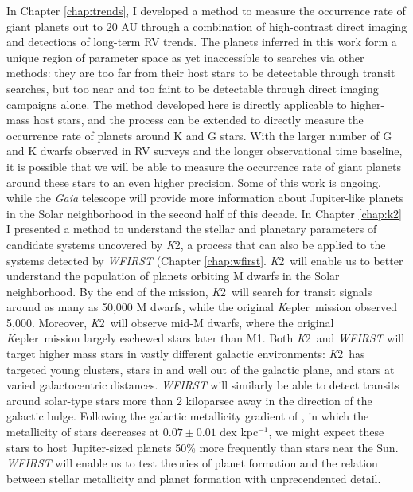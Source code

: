 \documentclass[12pt]{caltech_thesis}
\newcommand{\kep}{{\textit Kepler}}
\newcommand{\KT}{{\textit K2}}
\begin{document}
In Chapter \ref{chap:trends}, I developed a method to measure the occurrence rate of giant
planets out to 20 AU through a combination of high-contrast direct imaging and 
detections of long-term RV trends.
The planets inferred in this work form a unique region of parameter space as yet 
inaccessible to searches via other methods:
they are too far from their host stars to be detectable through transit searches,
but too near and too faint to be detectable through direct imaging campaigns alone.
The method developed here is directly applicable to higher-mass host stars, and the
process can be extended to directly measure the occurrence rate of planets around K and G
stars.
With the larger number of G and K dwarfs observed in RV surveys and the longer observational
time baseline, it is possible that we will be able to measure the occurrence rate of 
giant planets around these stars to an even higher precision.
Some of this work is ongoing, while the \textit{Gaia} telescope will provide more  information about Jupiter-like planets in the Solar neighborhood in the second half of
this decade.
In Chapter \ref{chap:k2} I presented a method to understand the stellar and planetary parameters of candidate systems uncovered by \KT, a process that can also be applied to the systems detected by \textit{WFIRST} (Chapter \ref{chap:wfirst}. 
\KT\ will enable us to better understand the population of planets orbiting M dwarfs 
in the Solar neighborhood. 
By the end of the mission, \KT\ will search for transit signals
around as many as 50,000 M dwarfs, while the original \kep\ mission observed 5,000.
Moreover, \KT\ will observe mid-M dwarfs, where the original \kep\ mission largely eschewed
stars later than M1.
Both \KT\ and \textit{WFIRST} will target higher mass stars in vastly different galactic
environments: \KT\ has targeted young clusters, stars in and well out of the galactic 
plane, and stars at varied galactocentric distances.
\textit{WFIRST} will similarly be able to detect transits around solar-type stars
more than 2 kiloparsec away in the direction of the galactic bulge. 
Following the galactic metallicity gradient of \citep{Rolleston00}, in which the 
metallicity of stars decreases at $0.07 \pm 0.01$ dex kpc$^{-1}$, we might expect
these stars to host Jupiter-sized planets 50\% more frequently than stars
near the Sun.
\textit{WFIRST} will enable us to test theories of planet formation and the relation
between stellar metallicity and planet formation with unprecendented detail.
\end{document}
